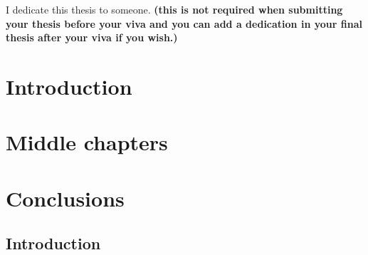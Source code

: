 \documentclass[oneside,12pt]{report}
\begin{document}



I dedicate this thesis to someone. \textbf{(this is not required when submitting your thesis before your viva and you can add a dedication in your final thesis after your viva if you wish.)}

\clearpage



\clearpage



\clearpage



\clearpage



\clearpage

\tableofcontents

\clearpage

\listoffigures

\clearpage

\listoftables

\clearpage
\pagestyle{main}

\chapter{Introduction}




\chapter{Middle chapters}


\chapter{Conclusions}


\begin{appendices}

\chapter{Introduction}
\label{appendix_introduction}


\end{appendices}

\clearpage %
\printbibliography[heading=bibintoc,title=References]
\end{document}
